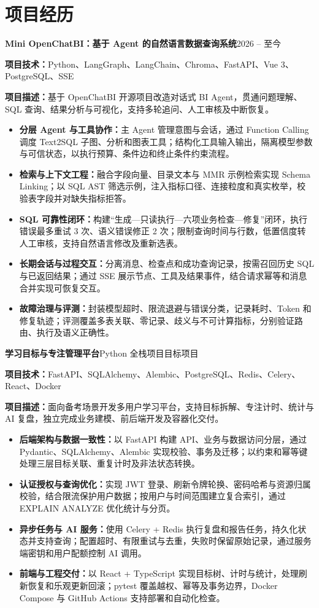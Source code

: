 \documentclass[10pt,a4paper]{article}
\newcommand{\datedsubsection}[2]{\noindent #1\hfill{\small #2}\par\vspace{1pt}}
\begin{document}
\section{项目经历}
\datedsubsection{\textbf{Mini OpenChatBI：基于 Agent 的自然语言数据查询系统}}{2026 -- 至今}
\textbf{项目技术：}Python、LangGraph、LangChain、Chroma、FastAPI、Vue 3、PostgreSQL、SSE\par
\textbf{项目描述：}基于 OpenChatBI 开源项目改造对话式 BI Agent，贯通问题理解、SQL 查询、结果分析与可视化，支持多轮追问、人工审核及中断恢复。
\begin{itemize}
  \item \textbf{分层 Agent 与工具协作：}主 Agent 管理意图与会话，通过 Function Calling 调度 Text2SQL 子图、分析和图表工具；结构化工具输入输出，隔离模型参数与可信状态，以执行预算、条件边和终止条件约束流程。
  \item \textbf{检索与上下文工程：}融合字段向量、目录文本与 MMR 示例检索实现 Schema Linking；以 SQL AST 筛选示例，注入指标口径、连接粒度和真实枚举，校验表字段并对缺失指标拒答。
  \item \textbf{SQL 可靠性闭环：}构建“生成—只读执行—六项业务检查—修复”闭环，执行错误最多重试 3 次、语义错误修正 2 次；限制查询时间与行数，低置信度转人工审核，支持自然语言修改及重新选表。
  \item \textbf{长期会话与过程交互：}分离消息、检查点和成功查询记录，按需召回历史 SQL 与已返回结果；通过 SSE 展示节点、工具及结果事件，结合请求幂等和消息合并实现可恢复交互。
  \item \textbf{故障治理与评测：}封装模型超时、限流退避与错误分类，记录耗时、Token 和修复轨迹；评测覆盖多表关联、零记录、歧义与不可计算指标，分别验证路由、执行及语义正确性。
\end{itemize}

\datedsubsection{\textbf{学习目标与专注管理平台}\quad Python 全栈项目}{目标项目}
\textbf{项目技术：}FastAPI、SQLAlchemy、Alembic、PostgreSQL、Redis、Celery、React、Docker\par
\textbf{项目描述：}面向备考场景开发多用户学习平台，支持目标拆解、专注计时、统计与 AI 复盘，独立完成业务建模、前后端开发及容器化交付。
\begin{itemize}
  \item \textbf{后端架构与数据一致性：}以 FastAPI 构建 API、业务与数据访问分层，通过 Pydantic、SQLAlchemy、Alembic 实现校验、事务及迁移；以约束和幂等键处理三层目标关联、重复计时及非法状态转换。
  \item \textbf{认证授权与查询优化：}实现 JWT 登录、刷新令牌轮换、密码哈希与资源归属校验，结合限流保护用户数据；按用户与时间范围建立复合索引，通过 EXPLAIN ANALYZE 优化统计与分页。
  \item \textbf{异步任务与 AI 服务：}使用 Celery + Redis 执行复盘和报告任务，持久化状态并支持查询；配置超时、有限重试与去重，失败时保留原始记录，通过服务端密钥和用户配额控制 AI 调用。
  \item \textbf{前端与工程交付：}以 React + TypeScript 实现目标树、计时与统计，处理刷新恢复和乐观更新回滚；pytest 覆盖越权、幂等及事务边界，Docker Compose 与 GitHub Actions 支持部署和自动化检查。
\end{itemize}
\end{document}
